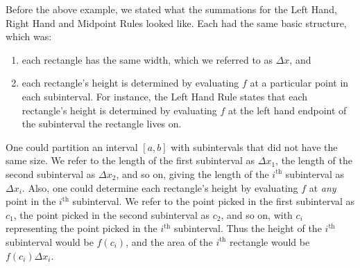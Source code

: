 %

Before the above example, we stated what the summations for the Left Hand, Right Hand and Midpoint Rules looked like. Each had the same basic structure, which was:
\begin{enumerate}
	\item each rectangle has the same width, which we referred to as $\Delta x$, and
	\item each rectangle's height is determined by evaluating $f$ at a particular point in each subinterval. For instance, the Left Hand Rule states that each rectangle's height is determined by evaluating $f$ at the left hand endpoint of the subinterval the rectangle lives on.
\end{enumerate}
One could partition an interval $[a,b]$ with subintervals that did not have the same size. We refer to the length of the first subinterval as $\Delta x_1$, the length of the second subinterval as $\Delta x_2$, and so on, giving the length of the $i^{\text{th}}$ subinterval as $\Delta x_i$. Also, one could determine each rectangle's height by evaluating $f$ at \emph{any} point in the $i^{\text{th}}$ subinterval. We refer to the point picked in the first subinterval as $c_1$, the point picked in the second subinterval as $c_2$, and so on, with $c_i$ representing the point picked in the $i^{\text{th}}$ subinterval. Thus the height of the $i^{\text{th}}$ subinterval would be $f(c_i)$, and the area of the $i^{\text{th}}$ rectangle would be $f(c_i)\Delta x_i$.

